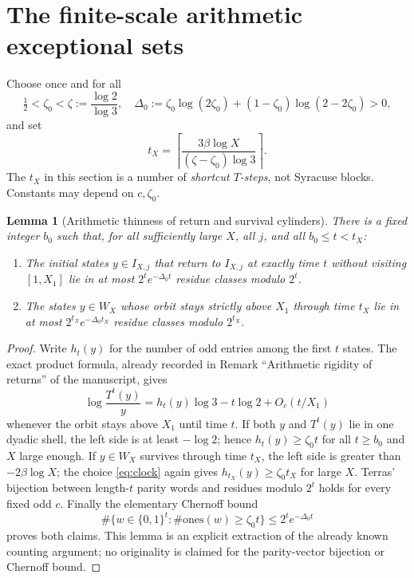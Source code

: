 \documentclass[11pt,a4paper]{article}
\newtheorem{lemma}[theorem]{Lemma}
\begin{document}
\section{The finite-scale arithmetic exceptional sets}
Choose once and for all
\[
 \tfrac12<\zeta_0<\zeta:=\frac{\log2}{\log3},\quad
 \Delta_0:=\zeta_0\log(2\zeta_0)+(1-\zeta_0)\log(2-2\zeta_0)>0,
\]
and set
\begin{equation}\label{eq:clock}
 t_X=\left\lceil\frac{3\beta\log X}{(\zeta-\zeta_0)\log3}\right\rceil.
\end{equation}
The $t_X$ in this section is a number of \emph{shortcut $T$-steps}, not Syracuse blocks. Constants may depend on $c,\zeta_0$.

\begin{lemma}[Arithmetic thinness of return and survival cylinders]\label{lem:thin}
There is a fixed integer $b_0$ such that, for all sufficiently large $X$, all $j$, and all $b_0\le t<t_X$:
\begin{enumerate}[label=(\roman*)]
\item The initial states $y\in I_{X,j}$ that return to $I_{X,j}$ at \emph{exactly} time $t$ without visiting $[1,X_1]$ lie in at most $2^te^{-\Delta_0t}$ residue classes modulo $2^t$.
\item The states $y\in W_X$ whose orbit stays strictly above $X_1$ through time $t_X$ lie in at most $2^{t_X}e^{-\Delta_0t_X}$ residue classes modulo $2^{t_X}$.
\end{enumerate}
\end{lemma}
\begin{proof}
Write $h_t(y)$ for the number of odd entries among the first $t$ states. The exact product formula, already recorded in Remark ``Arithmetic rigidity of returns'' of the manuscript, gives
\[
 \log\frac{T^t(y)}y=h_t(y)\log3-t\log2+O_c(t/X_1)
\]
whenever the orbit stays above $X_1$ until time $t$. If both $y$ and $T^t(y)$ lie in one dyadic shell, the left side is at least $-\log2$; hence $h_t(y)\ge\zeta_0t$ for all $t\ge b_0$ and $X$ large enough. If $y\in W_X$ survives through time $t_X$, the left side is greater than $-2\beta\log X$; the choice \eqref{eq:clock} again gives $h_{t_X}(y)\ge\zeta_0t_X$ for large $X$. Terras' bijection between length-$t$ parity words and residues modulo $2^t$ holds for every fixed odd $c$. Finally the elementary Chernoff bound
\[
 \#\{w\in\{0,1\}^t:\#\text{ones}(w)\ge\zeta_0t\}\le2^te^{-\Delta_0t}
\]
proves both claims. This lemma is an explicit extraction of the already known counting argument; no originality is claimed for the parity-vector bijection or Chernoff bound.
\end{proof}
\end{document}

